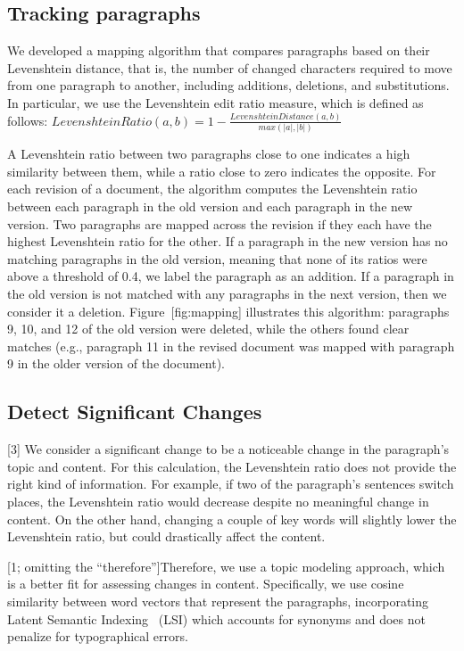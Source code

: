 \subsection{Tracking paragraphs}\label{tracking-paragraphs}

We developed a mapping algorithm that compares paragraphs based on their
Levenshtein distance, that is, the number of changed characters required
to move from one paragraph to another, including additions, deletions,
and substitutions. In particular, we use the Levenshtein edit ratio
measure, which is defined as follows:
\(Levenshtein Ratio(a,b) = 1-\frac{Levenshtein Distance(a,b)}{max(|a|,|b|)} \)

A Levenshtein ratio between two paragraphs close to one indicates a high
similarity between them, while a ratio close to zero indicates the
opposite. For each revision of a document, the algorithm computes the
Levenshtein ratio between each paragraph in the old version and each
paragraph in the new version. Two paragraphs are mapped across the
revision if they each have the highest Levenshtein ratio for the other.
If a paragraph in the new version has no matching paragraphs in the old
version, meaning that none of its ratios were above a threshold of 0.4,
we label the paragraph as an addition. If a paragraph in the old version
is not matched with any paragraphs in the next version, then we consider
it a deletion. Figure~{[}fig:mapping{]} illustrates this algorithm:
paragraphs 9, 10, and 12 of the old version were deleted, while the
others found clear matches (e.g., paragraph 11 in the revised document
was mapped with paragraph 9 in the older version of the document).

\subsection{Detect Significant
Changes}\label{detect-significant-changes}

{[}3{]} We consider a significant change to be a noticeable change in
the paragraph's topic and content. For this calculation, the Levenshtein
ratio does not provide the right kind of information. For example, if
two of the paragraph's sentences switch places, the Levenshtein ratio
would decrease despite no meaningful change in content. On the other
hand, changing a couple of key words will slightly lower the Levenshtein
ratio, but could drastically affect the content.

{[}1; omitting the ``therefore''{]}Therefore, we use a topic modeling
approach, which is a better fit for assessing changes in content.
Specifically, we use cosine similarity between word vectors that
represent the paragraphs, incorporating Latent Semantic
Indexing~\cite{deerwester1990indexing} (LSI) which accounts for synonyms
and does not penalize for typographical errors.

